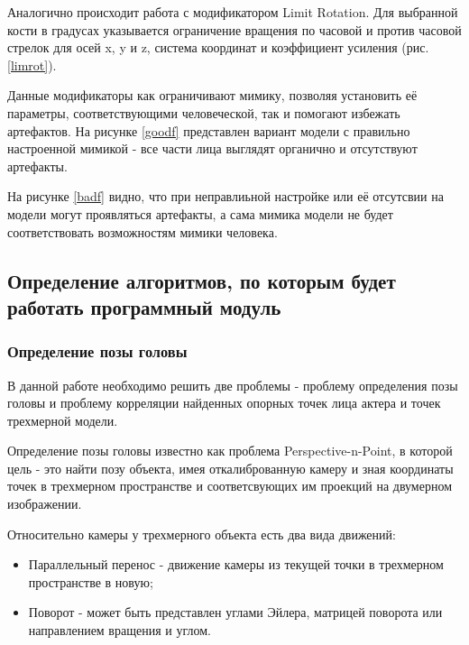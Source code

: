 Аналогично происходит работа с модификатором Limit Rotation. Для выбранной кости в градусах указывается ограничение вращения по часовой и против часовой стрелок для осей x, y и z, система координат и коэффициент усиления (рис. \ref{limrot}).


Данные модификаторы как ограничивают мимику, позволяя установить её параметры, соответствующими человеческой, так и  помогают избежать артефактов. На рисунке \ref{goodf} представлен вариант модели с правильно настроенной мимикой - все части лица выглядят органично и отсутствуют артефакты.


На рисунке \ref{badf} видно, что при неправлиьной настройке или её отсутсвии на модели могут проявляться артефакты, а сама мимика модели не будет соответствовать возможностям мимики человека.





\subsection{Определение алгоритмов, по которым будет работать программный модуль}

\subsubsection{Определение позы головы}

В данной работе необходимо решить две проблемы - проблему определения позы головы и проблему корреляции найденных опорных точек лица актера и точек трехмерной модели.

Определение позы головы известно как проблема Perspective-n-Point, в которой цель - это найти позу объекта, имея откалиброванную камеру и зная координаты точек в трехмерном пространстве и соответсвующих им проекций на двумерном изображении.

Относительно камеры у трехмерного объекта есть два вида движений:

\begin{itemize}
	\item Параллельный перенос - движение камеры из текущей точки в трехмерном пространстве в новую;
	\item Поворот - может быть представлен углами Эйлера, матрицей поворота или направлением вращения и углом.
\end{itemize}


